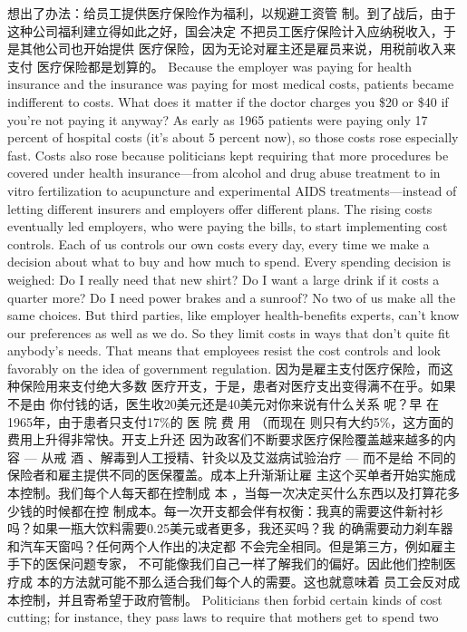 \begin{paracol}{2}
想出了办法：给员工提供医疗保险作为福利，以规避工资管
制。到了战后，由于这种公司福利建立得如此之好，国会决定
不把员工医疗保险计入应纳税收入，于是其他公司也开始提供
医疗保险，因为无论对雇主还是雇员来说，用税前收入来支付
医疗保险都是划算的。
\switchcolumn*
Because the employer was paying for health insurance and
the insurance was paying for most medical costs, patients became indifferent to costs. What does it matter if the doctor
charges you \$20 or \$40 if you're not paying it anyway? As early
as 1965 patients were paying only 17 percent of hospital costs
(it's about 5 percent now), so those costs rose especially fast.
Costs also rose because politicians kept requiring that more
procedures be covered under health insurance---from alcohol
and drug abuse treatment to in vitro fertilization to acupuncture and experimental AIDS treatments---instead of letting different insurers and employers offer different plans. The rising
costs eventually led employers, who were paying the bills, to
start implementing cost controls. Each of us controls our own
costs every day, every time we make a decision about what to
buy and how much to spend. Every spending decision is
weighed: Do I really need that new shirt? Do I want a large
drink if it costs a quarter more? Do I need power brakes and a
sunroof? No two of us make all the same choices. But third parties, like employer health-benefits experts, can't know our preferences as well as we do. So they limit costs in ways that don't
quite fit anybody's needs. That means that employees resist the
cost controls and look favorably on the idea of government regulation.
\switchcolumn
因为是雇主支付医疗保险，而这种保险用来支付绝大多数
医疗开支，于是，患者对医疗支出变得满不在乎。如果不是由
你付钱的话，医生收20美元还是40美元对你来说有什么关系
呢？早 在 1965年，由于患者只支付17\%的 医 院 费 用 （而现在
则只有大约5\%，这方面的费用上升得非常快。开支上升还
因为政客们不断要求医疗保险覆盖越来越多的内容 --- 从戒
酒 、解毒到人工授精、针灸以及艾滋病试验治疗 --- 而不是给
不同的保险者和雇主提供不同的医保覆盖。成本上升渐渐让雇
主这个买单者开始实施成本控制。我们每个人每天都在控制成
本 ，当每一次决定买什么东西以及打算花多少钱的时候都在控
制成本。每一次开支都会伴有权衡：我真的需要这件新衬衫
吗？如果一瓶大饮料需要0.25美元或者更多，我还买吗？我
的确需要动力刹车器和汽车天窗吗？任何两个人作出的决定都
不会完全相同。但是第三方，例如雇主手下的医保问题专家，
不可能像我们自己一样了解我们的偏好。因此他们控制医疗成
本的方法就可能不那么适合我们每个人的需要。这也就意味着
员工会反对成本控制，并且寄希望于政府管制。
\switchcolumn*
Politicians then forbid certain kinds of cost cutting; for instance, they pass laws to require that mothers get to spend two

\end{paracol}
